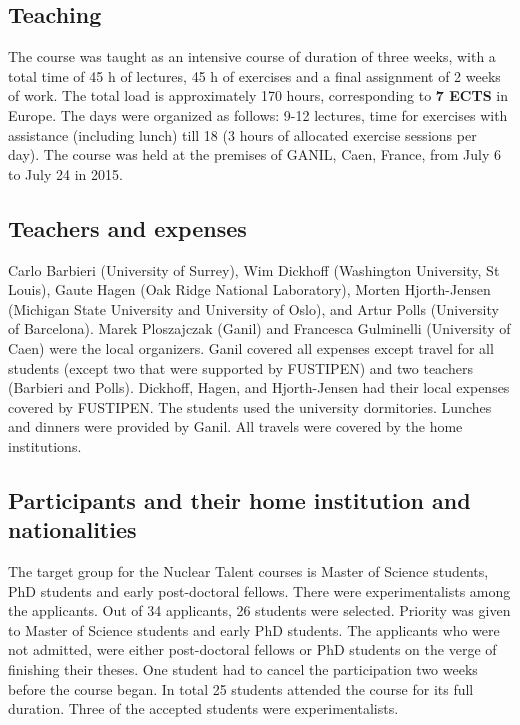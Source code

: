 \documentclass[prc,amsart,english]{revtex4}
\begin{document}
  
\subsection{Teaching}
The course was taught as an intensive  course of duration of three weeks, with a
total time of 45 h of lectures, 45 h of exercises and  a final assignment of 2 weeks of work.
The total load is approximately 170 hours, corresponding to  {\bf 7 ECTS} in Europe.
The days were organized as follows: 9-12 lectures, time for exercises with assistance (including lunch)
till 18 (3 hours of allocated exercise sessions per day).
The course was held at the premises of GANIL, Caen, France, from
July 6 to July 24 in 2015.




\subsection{Teachers and expenses}
Carlo Barbieri (University of Surrey), Wim Dickhoff (Washington University, St Louis), Gaute Hagen (Oak Ridge National Laboratory), Morten Hjorth-Jensen (Michigan State University and University of Oslo), and Artur Polls (University of Barcelona). Marek Ploszajczak (Ganil) and Francesca Gulminelli (University of Caen) were the local organizers. 
Ganil covered all expenses except travel for all students (except two that were supported by FUSTIPEN) and two teachers (Barbieri and Polls).
Dickhoff, Hagen, and Hjorth-Jensen had their local expenses covered by FUSTIPEN. The students used the university dormitories. Lunches and dinners were provided by Ganil. 
All travels were covered by the home institutions. 


\subsection{Participants and their home institution and nationalities}

The target group for the Nuclear Talent courses is Master of Science students, PhD students and early post-doctoral fellows.
There were  experimentalists among the applicants. Out of 34 applicants, 26 students were selected. Priority was given
to Master of Science students and early PhD students. The applicants who were not admitted, were either post-doctoral 
fellows or PhD students on the verge of finishing their theses. One student had to cancel the participation two weeks before the course began.
In total 25 students attended the course for its full duration. Three of the accepted students were experimentalists. 
\end{document}
